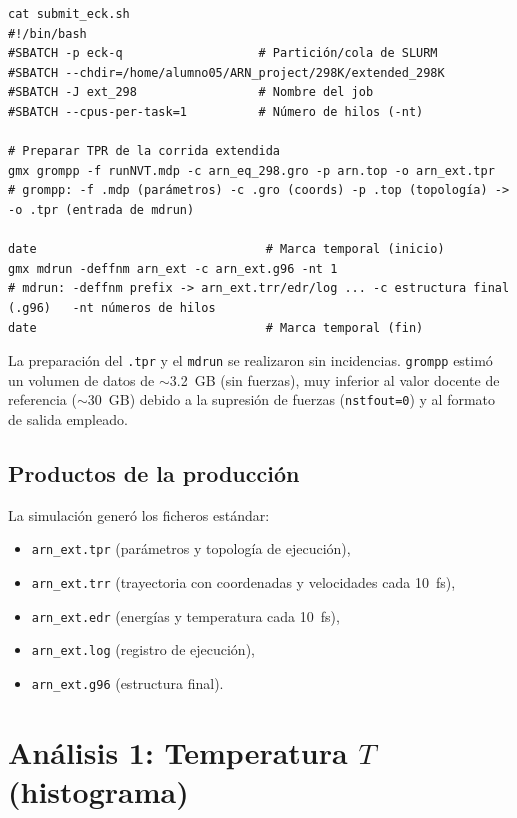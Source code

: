 \documentclass[12pt,a4paper]{article}
\begin{document}
\begin{lstlisting}[style=bashstyle]
cat submit_eck.sh
#!/bin/bash
#SBATCH -p eck-q                   # Partición/cola de SLURM
#SBATCH --chdir=/home/alumno05/ARN_project/298K/extended_298K
#SBATCH -J ext_298                 # Nombre del job
#SBATCH --cpus-per-task=1          # Número de hilos (-nt)

# Preparar TPR de la corrida extendida
gmx grompp -f runNVT.mdp -c arn_eq_298.gro -p arn.top -o arn_ext.tpr
# grompp: -f .mdp (parámetros) -c .gro (coords) -p .top (topología) -> -o .tpr (entrada de mdrun)

date                                # Marca temporal (inicio)
gmx mdrun -deffnm arn_ext -c arn_ext.g96 -nt 1
# mdrun: -deffnm prefix -> arn_ext.trr/edr/log ... -c estructura final (.g96)   -nt números de hilos
date                                # Marca temporal (fin)
\end{lstlisting}

\noindent
La preparación del \texttt{.tpr} y el \texttt{mdrun} se realizaron sin incidencias. \texttt{grompp} estimó un volumen de datos de \(\sim\)3.2~GB (sin fuerzas), muy inferior al valor docente de referencia (\(\sim\)30~GB) debido a la supresión de fuerzas (\texttt{nstfout=0}) y al formato de salida empleado.

\subsection{Productos de la producción}
La simulación generó los ficheros estándar:
\begin{itemize}[leftmargin=1.4em]
  \item \texttt{arn\_ext.tpr} (parámetros y topología de ejecución),
  \item \texttt{arn\_ext.trr} (trayectoria con coordenadas y velocidades cada \SI{10}{fs}),
  \item \texttt{arn\_ext.edr} (energías y temperatura cada \SI{10}{fs}),
  \item \texttt{arn\_ext.log} (registro de ejecución),
  \item \texttt{arn\_ext.g96} (estructura final).
\end{itemize}

\section{Análisis 1: Temperatura \texorpdfstring{$T$}{T} (histograma)}
\end{document}
